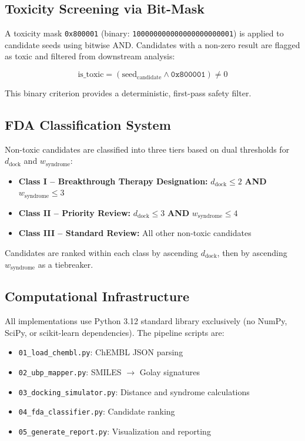 \documentclass[12pt,a4paper]{article}
\begin{document}
\subsection{Toxicity Screening via Bit-Mask}

A toxicity mask \texttt{0x800001} (binary: \texttt{100000000000000000000001}) is applied to candidate seeds using bitwise AND. Candidates with a non-zero result are flagged as toxic and filtered from downstream analysis:

\begin{equation}
\text{is\_toxic} = (\text{seed}_{\text{candidate}} \land \texttt{0x800001}) \neq 0
\end{equation}

This binary criterion provides a deterministic, first-pass safety filter.

\subsection{FDA Classification System}

Non-toxic candidates are classified into three tiers based on dual thresholds for $d_{\text{dock}}$ and $w_{\text{syndrome}}$:

\begin{itemize}
\item \textbf{Class I -- Breakthrough Therapy Designation:} $d_{\text{dock}} \leq 2$ \textbf{AND} $w_{\text{syndrome}} \leq 3$

\item \textbf{Class II -- Priority Review:} $d_{\text{dock}} \leq 3$ \textbf{AND} $w_{\text{syndrome}} \leq 4$

\item \textbf{Class III -- Standard Review:} All other non-toxic candidates
\end{itemize}

Candidates are ranked within each class by ascending $d_{\text{dock}}$, then by ascending $w_{\text{syndrome}}$ as a tiebreaker.

\subsection{Computational Infrastructure}

All implementations use Python 3.12 standard library exclusively (no NumPy, SciPy, or scikit-learn dependencies). The pipeline scripts are:

\begin{itemize}
\item \texttt{01\_load\_chembl.py}: ChEMBL JSON parsing
\item \texttt{02\_ubp\_mapper.py}: SMILES $\rightarrow$ Golay signatures
\item \texttt{03\_docking\_simulator.py}: Distance and syndrome calculations
\item \texttt{04\_fda\_classifier.py}: Candidate ranking
\item \texttt{05\_generate\_report.py}: Visualization and reporting
\end{itemize}
\end{document}
